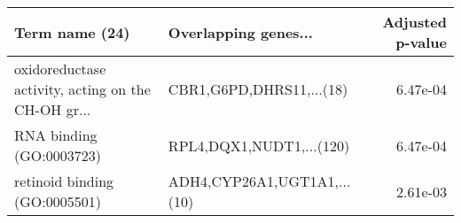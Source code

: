 \begin{tabular}{llr}
\toprule
                                    Term name (24) &        Overlapping genes... &  Adjusted p-value \\
\midrule
oxidoreductase activity, acting on the CH-OH gr... &    CBR1,G6PD,DHRS11,...(18) &          6.47e-04 \\
                          RNA binding (GO:0003723) &    RPL4,DQX1,NUDT1,...(120) &          6.47e-04 \\
                     retinoid binding (GO:0005501) & ADH4,CYP26A1,UGT1A1,...(10) &          2.61e-03 \\
\bottomrule
\end{tabular}
